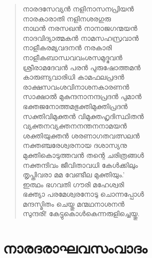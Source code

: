 \begin{verse}
നാരദസേവ്യന്‍ നളിനാസനപ്രിയന്‍\\
നാരകാരാതി നളിനശരഗുരു\\
നാഥന്‍ നരസഖന്‍ നാനാജഗന്മയന്‍\\
നാദവിദ്യാത്മകന്‍ നാമസഹസ്രവാന്‍\\
നാളീകരമ്യവദനന്‍ നരകാരി\\
നാളീകബാന്ധവവംശസമുദ്ഭവന്‍\\
ശ്രീരാമദേവന്‍ പരന്‍ പുരുഷോത്തമന്‍\\
കാരുണ്യവാരിധി കാമഫലപ്രദന്‍\\
രാക്ഷസവംശവിനാശനകാരണന്‍\\
സാക്ഷാല്‍ മുകുന്ദനാനന്ദപ്രദന്‍ പുമാന്‍\\
ഭക്തജനോത്തമഭുക്തിമുക്തിപ്രദന്‍\\
സക്തിവിമുക്തന്‍ വിമുക്തഹൃദിസ്ഥിതന്‍\\
വ്യക്തനവ്യക്തനനന്തനനാമയന്‍\\
ശക്തിയുക്തന്‍ ശരണാഗതവത്സലന്‍\\
നക്തഞ്ചരേശ്വരനായ ദശാസ്യനു\\
മുക്തികൊടുത്തവന്‍ തന്റെ ചരിത്രങ്ങള്‍\\
നക്തന്ദിവം ജീവിതാവധി കേള്‍ക്കിലും\\
തൃപ്തിവരാ മമ വേണ്ടീല മുക്തിയും.’\\
ഇത്ഥം ഭഗവതി ഗൗരി മഹേശ്വരി\\
ഭക്ത്യാ പരമേശ്വരനോടു ചൊന്നപ്പോള്‍\\
മന്ദസ്മിതം ചെയ്തു മന്മഥനാശനന്‍\\
സുന്ദരി! കേട്ടുകൊള്‍കെന്നരുളിച്ചെയ്തു.
\end{verse}

\bigskip

\section{നാരദരാഘവസംവാദം}

